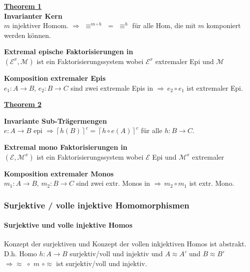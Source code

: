 \begin{multicols}{2}

\textbf{\underline{Theorem 1}} \\

\textbf{ Invarianter Kern} \\
$m$ injektiver Homom. $\Rightarrow \, \, \equiv^{m \circ h} \, \, = \, \, \equiv^h$ für alle Hom, die mit $m$ komponiert werden können.

\textbf{ Extremal epische Faktorisierungen in \syssig} \\
$(\mathcal{E}^{x}, \mathcal{M})$ ist ein Faktorisierungssystem wobei $\mathcal{E}^{x}$ extremaler Epi und $\mathcal{M}$ \mono

\textbf{ Komposition extremaler Epis} \\
$e_1 : A \rightarrow B$, $e_2 : B \rightarrow C$ sind zwei extremale Epis in \syssig $\Rightarrow \, e_2 \circ e_1$ ist extremaler Epi.

\columnbreak
\textbf{\underline{Theorem 2}}

\textbf{ Invariante Sub-Trägermengen} \\
$e: A \rightarrow B$ epi $\Rightarrow \left\lceil h(B) \right\rceil ^{c} = \left\lceil h\circ e(A)\right\rceil ^{c}$ für alle \homos $h: B \rightarrow C$.

\textbf{ Extremal mono Faktorisierungen in \syssig} \\
$(\mathcal{E}, \mathcal{M}^{x})$ ist ein Faktorisierungssystem wobei $\mathcal{E}$ Epi und $\mathcal{M}^{x}$ extremaler \mono

\textbf{ Komposition extremaler Monos} \\
$m_1 : A \rightarrow B$, $m_2 : B \rightarrow C$ sind zwei extr. Monos in \syssig $\Rightarrow \, m_2 \circ m_1$ ist extr. Mono.
\end{multicols}

\subsubsection{Surjektive / volle injektive Homomorphismen}

\paragraph{ Surjektive und volle injektive Homos}
Konzept der surjektiven und Konzept der vollen inkjektiven Homos ist abstrakt. D.h. Homo $h:A \rightarrow B$ surjektiv/voll und injektiv und $A \approx A'$ und $B \approx B'$ $\Rightarrow \approx \, \, \circ \, \, m \, \, \circ \approx$ ist surjektiv/voll und injektiv.

